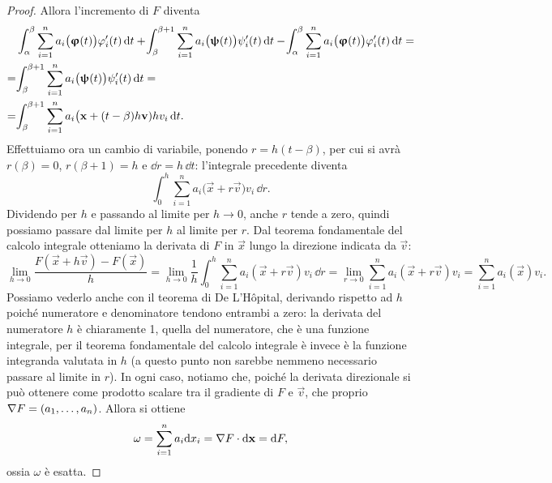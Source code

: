 \begin{proof}
	Allora l'incremento di $F$ diventa
	\begin{equation}
		\begin{aligned}
			&\int_\alpha^\beta\sum_{i=1}^na_i\big(\bm{\upvarphi}(t)\big)\varphi_i'(t)\,\textup{d} t+\!\int_\beta^{\beta+1}\sum_{i=1}^na_i\big(\bm{\uppsi}(t)\big)\psi_i'(t)\,\textup{d} t-\!\int_\alpha^\beta\sum_{i=1}^na_i\big(\bm{\upvarphi}(t)\big)\varphi_i'(t)\,\textup{d} t=\\
			=&\!\int_\beta^{\beta+1}\sum_{i=1}^na_i\big(\bm{\uppsi}(t)\big)\psi_i'(t)\,\textup{d} t=\\
			=&\!\int_\beta^{\beta+1}\sum_{i=1}^na_i\big(\mathbf{x}+(t-\beta)h\mathbf{v})hv_i\,\textup{d} t.
		\end{aligned}
	\end{equation}
	Effettuiamo ora un cambio di variabile, ponendo $r=h(t-\beta)$, per cui si avrà $r(\beta)=0$, $r(\beta+1)=h$ e $\dd r=h\,\dd t$: l'integrale precedente diventa
	\begin{equation}
		\int_0^h\sum_{i=1}^na_i\big(\vec x+r\vec v)v_i\,\dd r.
	\end{equation}
	Dividendo per $h$ e passando al limite per $h\to0$, anche $r$ tende a zero, quindi possiamo passare dal limite per $h$ al limite per $r$.
	Dal teorema fondamentale del calcolo integrale otteniamo la derivata di $F$ in $\vec x$ lungo la direzione indicata da $\vec v$:
	\begin{equation}
		\lim_{h\to0}\frac{F(\vec x+h\vec v)-F(\vec x)}{h}=\lim_{h\to0}\frac1{h}\int_0^h\sum_{i=1}^na_i(\vec x+r\vec v)v_i\,\dd r=\lim_{r\to 0}\sum_{i=1}^na_i(\vec x+r\vec v)v_i=\sum_{i=1}^na_i(\vec x)v_i.
	\end{equation}
	Possiamo vederlo anche con il teorema di De L'H\^opital, derivando rispetto ad $h$ poich\'e numeratore e denominatore tendono entrambi a zero: la derivata del numeratore $h$ è chiaramente 1, quella del numeratore, che è una funzione integrale, per il teorema fondamentale del calcolo integrale è invece è la funzione integranda valutata in $h$ (a questo punto non sarebbe nemmeno necessario passare al limite in $r$).
	In ogni caso, notiamo che, poiché la derivata direzionale si può ottenere come prodotto scalare tra il gradiente di $F$ e $\vec v$, che proprio $\nabla F=(a_1,\dots,a_n)$.
	Allora si ottiene
	\begin{equation}
		\omega=\sum_{i=1}^na_i\textup{d} x_i={\nabla F}\cdot{\textup{d}\mathbf{x}}=\textup{d} F,
	\end{equation}
	ossia $\omega$ è esatta.
\end{proof}

